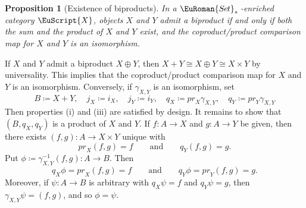 \documentclass [12pt,oneside]{book}%
\makeatletter
\theoremstyle{captionstyle}  %
\newtheorem{proposition}[theorem]{Proposition}
\renewenvironment{proof}[1][\proofname]{\vspace{-2ex}\par       %
	\pushQED{\qed}%
	\normalfont \topsep6\p@\@plus6\p@\relax
	\trivlist
	\item[\hskip\labelsep
	            \color{proofcaption}\bfseries                %
	            #1\@addpunct{\quad}]\ignorespaces
}{%
	\popQED\endtrivlist\@endpefalse
}
\newcommand{\DefEq}{\coloneq} 		%
\newcommand{\from}{\colon}				%
\newcommand{\PrjctnOnto}[1]{\textit{pr}_{#1}} 	%
\newcommand{\SetsBsd}{\EuRoman{S{\kern-0.12ex}e{\hskip-0.14ex}t}_{\ast}\,}	%
\newcommand{\Ctgry}[1]{\EuScript{#1}}					%
\newcommand{\Prdct}[2]{#1 \times #2}	 	%
\newcommand{\PrdctMapInto}[1]{( #1)}			%
\newcommand{\BiPrdct}[2]{#1\oplus #2}
\newcommand{\SumProdComp}[2]{\gamma_{#1,#2}}			%
\makeatother
\begin{document}
\begin{proposition}[Existence of biproducts]
    \label{thm:BiProduct-Existence}
    In a $\SetsBsd$-enriched category $\Ctgry{X}$, objects $X$ and $Y$ admit a biproduct if and only if both the sum and the product of $X$ and $Y$ exist, and the coproduct/product comparison map for $X$ and $Y$ is an isomorphism.
\end{proposition}
\begin{proof}
    If $X$ and $Y$ admit a biproduct $\BiPrdct{X}{Y}$, then $X+Y\cong \BiPrdct{X}{Y}\cong \Prdct{X}{Y}$ by universality. This implies that the coproduct/product comparison map for $X$ and $Y$ is an isomorphism. Conversely, if $\SumProdComp{X}{Y}$ is an isomorphism, set
    \begin{equation*}
        B\DefEq X+Y,\quad j_X\DefEq i_X,\quad j_Y\DefEq i_Y,\quad q_X\DefEq \PrjctnOnto{X}\SumProdComp{X}{Y},\quad q_Y\DefEq \PrjctnOnto{Y}\SumProdComp{X}{Y}
    \end{equation*}
    Then properties (i) and (iii) are satisfied by design. It remains to show that $(B,q_X,q_Y)$ is a product of $X$ and $Y$. If $f\from A\to X$ and $g\from A\to Y$ be given, then there exists $\PrdctMapInto{f,g}\from A\to \Prdct{X}{Y}$ unique with
    \begin{equation*}
        \PrjctnOnto{X}\PrdctMapInto{f,g} = f \qquad \text{and}\qquad q_Y\PrdctMapInto{f,g} = g.
    \end{equation*}
    Put $\phi\DefEq \SumProdComp{X}{Y}^{-1}\PrdctMapInto{f,g}\from A\to B$. Then
    \begin{equation*}
        q_X\phi = \PrjctnOnto{X} \PrdctMapInto{f,g} = f \qquad \text{and}\qquad q_Y\phi = \PrjctnOnto{Y} \PrdctMapInto{f,g} = g.
    \end{equation*}
    Moreover, if $\psi\from A\to B$ is arbitrary with $q_X\psi =f$ and $q_Y\psi = g$, then $\SumProdComp{X}{Y}\psi = (f,g)$, and so $\phi=\psi$.
\end{proof}
\end{document}
